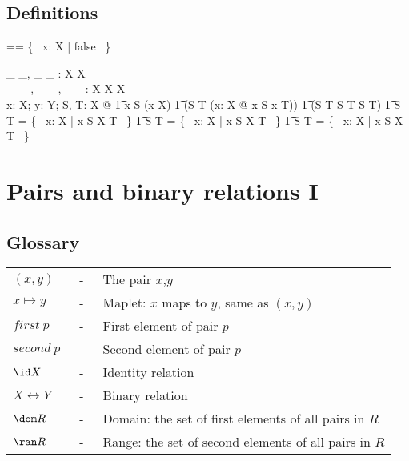 \subsection*{Definitions}

\begin{zed} \emptyset[X] == \{~ x: X | false ~\} \end{zed}

\begin{gendef}[X]
	\_ \subseteq \_, \_ \subset \_ : \power X \rel \power X \\ 
   	\_ \cup \_ , \_ \cap \_, \_ \setminus \_: \power X \cross \power X \fun \power X \\
\where
	\forall x: X; y: Y; S, T: \power X @ 
\also
\t1	x \notin S \iff \lnot (x \in X) \land
\also
\t1	(S \subseteq T \iff (\forall x: X @ x \in S \implies x \in T)) \land
\also
\t1	(S \subset T \iff S \subseteq T \land S \neq T) \land
\also 
\t1	S \cup T = \{~ x: X | x \in S \lor X \in T ~\} \land
\also 
\t1	S \cap T = \{~ x: X | x \in S \land X \in T ~\} \land
\also 
\t1	S \setminus T = \{~ x: X | x \in S \land X \notin T ~\}
\also
\end{gendef}

\newpage

\section*{Pairs and binary relations I}

\subsection*{Glossary}

\begin{tabular}{l c l}
$(x,y)$	  & ~-~ & The pair $x$,$y$ \\
$x \mapsto y$ & ~-~ & Maplet: $x$ maps to $y$, same as $(x,y)$ \\
$first~p$ & ~-~ & First element of pair $p$ \\
$second~p$ & ~-~ & Second element of pair $p$ \\
$\id X$ & ~-~ & Identity relation \\
$X \rel Y$ & ~-~ & Binary relation \\
$\dom R$ & ~-~ & Domain: the set of first elements of all pairs in $R$ \\
$\ran R$ & ~-~ & Range: the set of second elements of all pairs in $R$ \\
\end{tabular}

